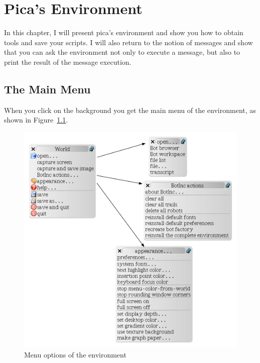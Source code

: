 \documentclass[a4paper,10pt,twoside]{book}
\begin{document}
    \sloppy
\fi

\chapter{Pica’s Environment}\label{cha:environment}


In this chapter, I will present pica’s environment and show you how to obtain tools and save 
your scripts. I will also return to the notion of messages and show that you can ask the environment not only to execute a message, but also to print the result of the message execution. 


\section{The Main Menu}

When you click on the background you get the main menu of the environment, as shown in 
Figure~\ref{fig:allmenus}. 



\begin{figure}[!h]
	\centerline{\includegraphics[width=\textwidth]{allMenu}}
	\caption{Menu options of the environment\label{fig:allmenus}}
\end{figure}
\end{document}

